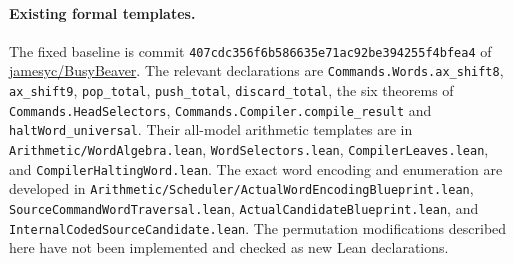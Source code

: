 \documentclass[10pt]{article}
\newcommand{\code}[1]{\texttt{\nolinkurl{#1}}}
\begin{document}
\paragraph{Existing formal templates.}
The fixed baseline is commit
\code{407cdc356f6b586635e71ac92be394255f4bfea4} of
\href{https://github.com/jamesyc/BusyBeaver}{jamesyc/BusyBeaver}.
The relevant declarations are
\code{Commands.Words.ax_shift8}, \code{ax_shift9},
\code{pop_total}, \code{push_total}, \code{discard_total},
the six theorems of \code{Commands.HeadSelectors},
\code{Commands.Compiler.compile_result} and
\code{haltWord_universal}.  Their all-model arithmetic templates
are in \code{Arithmetic/WordAlgebra.lean},
\code{WordSelectors.lean}, \code{CompilerLeaves.lean}, and
\code{CompilerHaltingWord.lean}.  The exact word encoding and
enumeration are developed in
\code{Arithmetic/Scheduler/ActualWordEncodingBlueprint.lean},
\code{SourceCommandWordTraversal.lean},
\code{ActualCandidateBlueprint.lean}, and
\code{InternalCodedSourceCandidate.lean}.
The permutation modifications described here have not been
implemented and checked as new Lean declarations.
\end{document}
